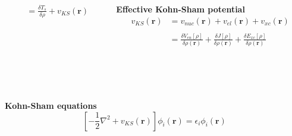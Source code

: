 \documentclass[mathserif, 8pt]{beamer}
\begin{document}
\begin{frame}
\begin{columns}
\begin{column}{.50\textwidth}
\begin{align}
	\nonumber
	&= \frac{\delta T_s}{\delta \rho} + v_{KS}(\boldsymbol{r})
    \end{align}
    \end{column}
    \begin{column}{.50\textwidth}
    \centering
    \textbf{Effective Kohn-Sham potential}
    \begin{align}
	\nonumber
	v_{KS}(\boldsymbol{r}) &= 
	v_{nuc}(\boldsymbol{r}) + v_{el}(\boldsymbol{r}) + v_{xc}(\boldsymbol{r})\\
	\nonumber
				&\\
	\nonumber
				&=
	\frac{\delta V_{en}[\rho]}{\delta \rho(\boldsymbol{r})} + 
	\frac{\delta J[\rho]}{\delta \rho(\boldsymbol{r})} + 
	\frac{\delta E_{xc}[\rho]}{\delta \rho(\boldsymbol{r})}
    \end{align}
    \end{column}
    \end{columns}
    \ \\
    \ \\
    \ \\
    \centering
    \textbf{Kohn-Sham equations}
    \begin{equation}
	\nonumber
	\left[-\frac{1}{2}\nabla^2 + v_{KS}(\boldsymbol{r})\right]\phi_i(\boldsymbol{r}) = 
	\epsilon_i\phi_i(\boldsymbol{r})
    \end{equation}
\end{frame}
\end{document}
